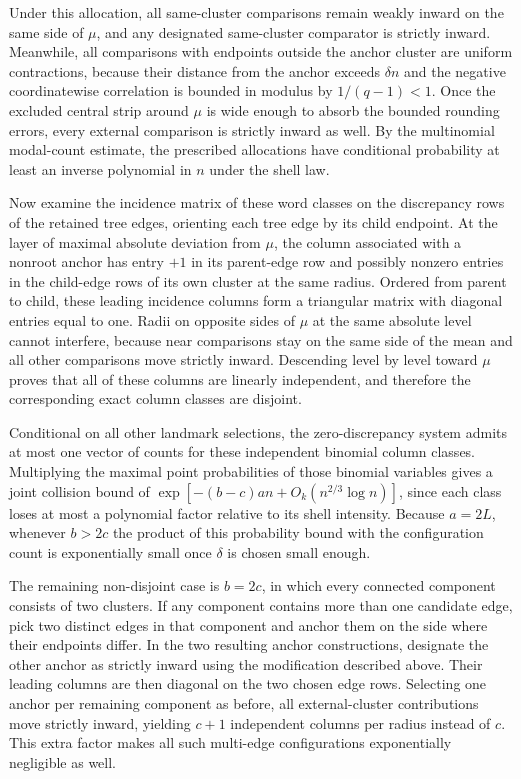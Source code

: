 Under this allocation, all same-cluster comparisons remain weakly inward on the same side of \(\mu\), and any designated same-cluster comparator is strictly inward. Meanwhile, all comparisons with endpoints outside the anchor cluster are uniform contractions, because their distance from the anchor exceeds \(\delta n\) and the negative coordinatewise correlation is bounded in modulus by \(1/(q-1)<1\). Once the excluded central strip around \(\mu\) is wide enough to absorb the bounded rounding errors, every external comparison is strictly inward as well. By the multinomial modal-count estimate, the prescribed allocations have conditional probability at least an inverse polynomial in \(n\) under the shell law.

Now examine the incidence matrix of these word classes on the discrepancy rows of the retained tree edges, orienting each tree edge by its child endpoint. At the layer of maximal absolute deviation from \(\mu\), the column associated with a nonroot anchor has entry \(+1\) in its parent-edge row and possibly nonzero entries in the child-edge rows of its own cluster at the same radius. Ordered from parent to child, these leading incidence columns form a triangular matrix with diagonal entries equal to one. Radii on opposite sides of \(\mu\) at the same absolute level cannot interfere, because near comparisons stay on the same side of the mean and all other comparisons move strictly inward. Descending level by level toward \(\mu\) proves that all of these columns are linearly independent, and therefore the corresponding exact column classes are disjoint.

Conditional on all other landmark selections, the zero-discrepancy system admits at most one vector of counts for these independent binomial column classes. Multiplying the maximal point probabilities of those binomial variables gives a joint collision bound of \(\exp[-(b-c)an+O_k(n^{2/3}\log n)]\), since each class loses at most a polynomial factor relative to its shell intensity. Because \(a=2L\), whenever \(b>2c\) the product of this probability bound with the configuration count is exponentially small once \(\delta\) is chosen small enough.

The remaining non-disjoint case is \(b=2c\), in which every connected component consists of two clusters. If any component contains more than one candidate edge, pick two distinct edges in that component and anchor them on the side where their endpoints differ. In the two resulting anchor constructions, designate the other anchor as strictly inward using the modification described above. Their leading columns are then diagonal on the two chosen edge rows. Selecting one anchor per remaining component as before, all external-cluster contributions move strictly inward, yielding \(c+1\) independent columns per radius instead of \(c\). This extra factor makes all such multi-edge configurations exponentially negligible as well.

